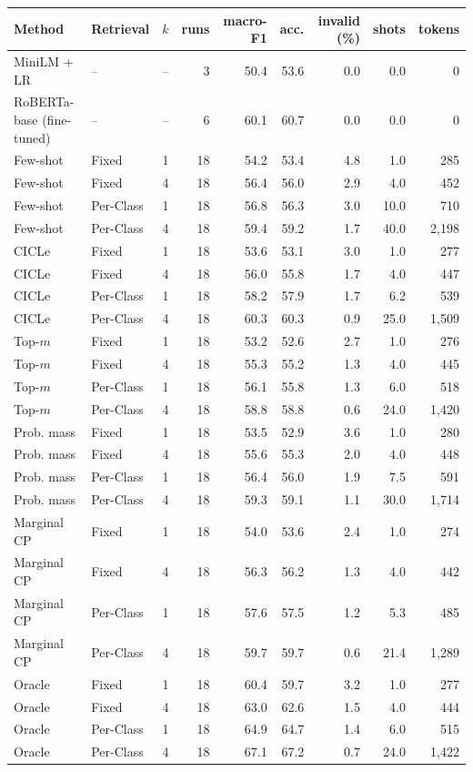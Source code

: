 \begin{tabular}{llrrrrrrr}
\toprule
Method & Retrieval & $k$ & runs & macro-F1 & acc. & invalid (\%) & shots & tokens \\
\midrule
MiniLM + LR & -- & -- & 3 & 50.4 & 53.6 & 0.0 & 0.0 & 0 \\
RoBERTa-base (fine-tuned) & -- & -- & 6 & 60.1 & 60.7 & 0.0 & 0.0 & 0 \\
\midrule
Few-shot & Fixed & 1 & 18 & 54.2 & 53.4 & 4.8 & 1.0 & 285 \\
Few-shot & Fixed & 4 & 18 & 56.4 & 56.0 & 2.9 & 4.0 & 452 \\
Few-shot & Per-Class & 1 & 18 & 56.8 & 56.3 & 3.0 & 10.0 & 710 \\
Few-shot & Per-Class & 4 & 18 & 59.4 & 59.2 & 1.7 & 40.0 & 2,198 \\
CICLe & Fixed & 1 & 18 & 53.6 & 53.1 & 3.0 & 1.0 & 277 \\
CICLe & Fixed & 4 & 18 & 56.0 & 55.8 & 1.7 & 4.0 & 447 \\
CICLe & Per-Class & 1 & 18 & 58.2 & 57.9 & 1.7 & 6.2 & 539 \\
CICLe & Per-Class & 4 & 18 & 60.3 & 60.3 & 0.9 & 25.0 & 1,509 \\
\midrule
Top-$m$ & Fixed & 1 & 18 & 53.2 & 52.6 & 2.7 & 1.0 & 276 \\
Top-$m$ & Fixed & 4 & 18 & 55.3 & 55.2 & 1.3 & 4.0 & 445 \\
Top-$m$ & Per-Class & 1 & 18 & 56.1 & 55.8 & 1.3 & 6.0 & 518 \\
Top-$m$ & Per-Class & 4 & 18 & 58.8 & 58.8 & 0.6 & 24.0 & 1,420 \\
Prob. mass & Fixed & 1 & 18 & 53.5 & 52.9 & 3.6 & 1.0 & 280 \\
Prob. mass & Fixed & 4 & 18 & 55.6 & 55.3 & 2.0 & 4.0 & 448 \\
Prob. mass & Per-Class & 1 & 18 & 56.4 & 56.0 & 1.9 & 7.5 & 591 \\
Prob. mass & Per-Class & 4 & 18 & 59.3 & 59.1 & 1.1 & 30.0 & 1,714 \\
Marginal CP & Fixed & 1 & 18 & 54.0 & 53.6 & 2.4 & 1.0 & 274 \\
Marginal CP & Fixed & 4 & 18 & 56.3 & 56.2 & 1.3 & 4.0 & 442 \\
Marginal CP & Per-Class & 1 & 18 & 57.6 & 57.5 & 1.2 & 5.3 & 485 \\
Marginal CP & Per-Class & 4 & 18 & 59.7 & 59.7 & 0.6 & 21.4 & 1,289 \\
Oracle & Fixed & 1 & 18 & 60.4 & 59.7 & 3.2 & 1.0 & 277 \\
Oracle & Fixed & 4 & 18 & 63.0 & 62.6 & 1.5 & 4.0 & 444 \\
Oracle & Per-Class & 1 & 18 & 64.9 & 64.7 & 1.4 & 6.0 & 515 \\
Oracle & Per-Class & 4 & 18 & 67.1 & 67.2 & 0.7 & 24.0 & 1,422 \\
\bottomrule
\end{tabular}
